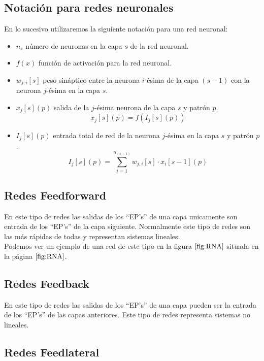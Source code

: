\subsection{Notaci\'on para redes neuronales}

En lo sucesivo utilizaremos la siguiente notaci\'on para una red neuronal:
\begin{itemize}
\item $n_s$ n\'umero de neuronas en la capa $s$ de la red neuronal.
\item $f(x)$ funci\'on de activaci\'on para la red neuronal.
\item $w_{j,i}[s]$ peso sin\'aptico entre la neurona $i$-\'esima de la capa
$(s-1)$ con la neurona $j$-\'esima en la capa $s$.
\item $x_j[s](p)$ salida de la $j$-\'esima neurona de la capa $s$ y patr\'on
$p$.
\begin{displaymath}
x_j[s](p) = f(I_j[s](p))
\end{displaymath}
\item $I_j[s](p)$ entrada total de red de la neurona $j$-\'esima en la capa $s$
y patr\'on $p$.
\begin{displaymath}
I_j[s](p) = \sum_{i=1}^{n_{(s-1)}} w_{j,i}[s]\cdot x_i[s-1](p)
\end{displaymath}
\end{itemize}

\subsection{Redes Feedforward}

En este tipo de redes las salidas de los ``EP's'' de una capa unicamente son
entrada de los ``EP's'' de la capa siguiente. Normalmente este tipo de redes
son las m\'as r\'apidas de todas y representan sistemas lineales. \\

Podemos ver un ejemplo de una red de este tipo en la figura $\ref{fig:RNA}$ 
situada en la p\'agina $\pageref{fig:RNA}$.

\subsection{Redes Feedback} 

En este tipo de redes las salidas de los ``EP's'' de una capa pueden ser la
entrada de los ``EP's'' de las capas anteriores. Este tipo de redes representa
sistemas no lineales.

\subsection{Redes Feedlateral}

